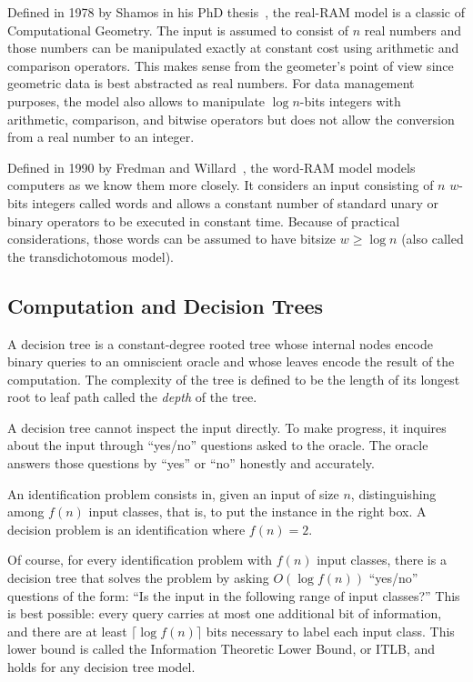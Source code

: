 Defined in 1978 by Shamos in his PhD thesis~\cite[Section~2.3]{Sha78},
the real-RAM model is a classic of Computational Geometry. The input is assumed
to consist of \(n\) real numbers and those numbers can be manipulated
exactly at constant cost using arithmetic and comparison operators.
This makes sense from the geometer's point of view since geometric data is
best abstracted as real numbers.
For data management purposes, the model also allows to manipulate \(\log
n\)-bits integers with arithmetic, comparison, and bitwise operators but does
not allow the conversion from a real number to an integer.

Defined in 1990 by Fredman and Willard~\cite{FW90},
the word-RAM model models computers as we know them more closely. It considers
an input consisting of \(n\) \(w\)-bits integers called words and allows a
constant number of standard unary or binary operators to be executed in
constant time.
%
Because of practical considerations,
those words can be assumed to have bitsize \(w \geq \log n\) (also called the
transdichotomous model).

\subsection{Computation and Decision Trees}%
\label{sec:models-of-computation:algorithms:trees}

A decision tree is a constant-degree rooted tree whose internal nodes encode
binary queries to an omniscient oracle and whose leaves encode the result of the
computation. The complexity of the tree is defined to be the length of
its longest root to leaf path called the \emph{depth} of the tree.

A decision tree cannot inspect the input directly.
To make progress, it inquires about the input through ``yes/no'' questions
asked to the oracle. The oracle answers those questions by ``yes'' or ``no''
honestly and accurately.

An identification problem consists in, given an input of size \(n\),
distinguishing among \(f(n)\) input classes, that is, to put the instance in
the right box. A decision problem is an identification where \(f(n) = 2\).

Of course, for every identification problem with \(f(n)\) input classes,
there is a decision tree that solves the problem by asking
\(O(\log f(n))\) ``yes/no'' questions of the form:
``Is the input in the following range of input classes?''
%
This is best possible: every query carries at most one additional bit of
information, and there are at least \(\lceil \log f(n) \rceil\) bits necessary
to label each input class. This lower bound is called the Information Theoretic
Lower Bound, or ITLB, and holds for any decision tree model.

